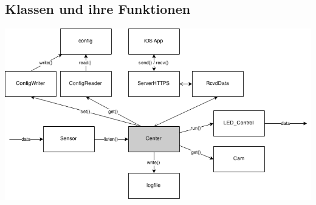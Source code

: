 
\subsection{Klassen und ihre Funktionen}
\includegraphics[width=1 \textwidth]{./data/ApplicationConcept.png}{\centering}
